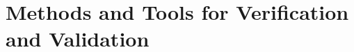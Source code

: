 \documentclass{template/openetcs_report}
\begin{document}
% 



\part{Methods and Tools for Verification and Validation}
\label{sec:methods-and-tools}

% 



%




%



\nocite{*}
\end{document}
